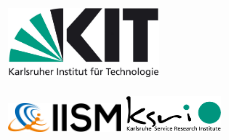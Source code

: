 \begin{titlepage}



\begin{figure}[htbp]

  \begin{minipage}[b]{.4\textwidth}
    \includegraphics[width=4cm]{0_Logos/kit.jpg}
  \end{minipage}%
  \hfill
  \begin{minipage}[b]{.6\textwidth}
	\begin{flushright}
	    \includegraphics[width=3cm]{0_Logos/IISM_logo.png}
	    \hspace{0.3cm}
        \includegraphics[width=2.5cm]{0_Logos/KSRI_logo.png}
	\end{flushright}
  \end{minipage}

\end{figure}


\end{titlepage}
